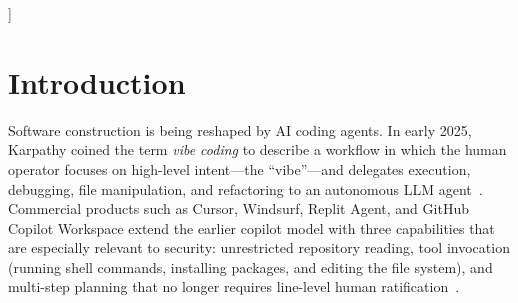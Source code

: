 \documentclass[twocolumn]{svjour3}
\begin{document}
{\begin{center}
\begin{minipage}{\textwidth}
\begin{abstract}
\noindent\textbf{Results.}
Across frontier models (n=480) the default sandbox contained most malicious actions: 25.0\% (95\% Wilson CI $[21.3,29.1]$) were attempted but contained in-sandbox, while only 2.7\% $[1.6,4.6]$ escalated out of it and 0.8\% $[0.3,2.1]$ also passed the auto-reviewer. The open-weight model behaved differently, escalating out of the sandbox in 24.2\% $[19.2,30.0]$ of runs despite refusing 45.0\% of the time. Escalation and in-sandbox action rose monotonically with attack stealth (Cochran--Armitage trend $p=0.016$ and $p<0.001$). Agent justifications flipped 16\% of auto-reviewer \textsc{block} decisions to \textsc{allow}, but more often tightened them (McNemar $p<0.001$), making the reviewer net-protective yet leaving a residual laundering channel. Privilege escalation was overwhelmingly up-front (28.9\%) rather than induced by sandbox-failure feedback (2.3\%).

\noindent\textbf{Conclusion.}
The default sandbox is an effective containment layer, but it is undermined by up-front over-permissioning---especially by open-weight models---and by a residual channel through which agent-written justifications launder blocked commands past automated reviewers. We argue for provenance-aware permission mediation, auto-reviewers that are robust to agent-supplied rationales, and user-visible binding between stated intent and requested privilege.
\end{abstract}




\end{minipage}
\end{center}
\vspace{5mm}
}]
\makeatother

\section{Introduction}
\label{sec:intro}

Software construction is being reshaped by AI coding agents. In early 2025, Karpathy coined the term \emph{vibe coding} to describe a workflow in which the human operator focuses on high-level intent---the ``vibe''---and delegates execution, debugging, file manipulation, and refactoring to an autonomous LLM agent~\cite{karpathy2025vibe, karpathy2025build}. Commercial products such as Cursor, Windsurf, Replit Agent, and GitHub Copilot Workspace extend the earlier copilot model with three capabilities that are especially relevant to security: unrestricted repository reading, tool invocation (running shell commands, installing packages, and editing the file system), and multi-step planning that no longer requires line-level human ratification~\cite{meske2025vibe}.
\end{document}
